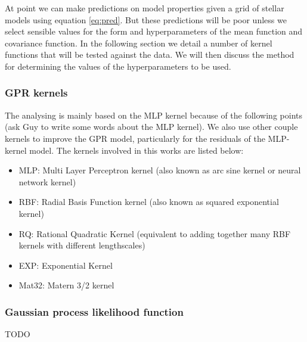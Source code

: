 At point we can make predictions on model properties given a grid of stellar models using equation \ref{eq:pred}.  But these predictions will be poor unless we select sensible values for the form and hyperparameters of the mean function and covariance function.  In the following section we detail a number of kernel functions that will be tested against the data.  We will then discuss the method for determining the values of the hyperparameters to be used.

\subsubsection{GPR kernels}
The analysing is mainly based on the MLP kernel because of the following points (ask Guy to write some words about the MLP kernel).
We also use other couple kernels to improve the GPR model, particularly for the residuals of the MLP-kernel model.  
The kernels involved in this works are listed below:

\begin{itemize}
\item MLP: Multi Layer Perceptron kernel (also known as arc sine kernel or neural network kernel)
\item RBF: Radial Basis Function kernel (also known as squared exponential kernel)
\item RQ: Rational Quadratic Kernel (equivalent to adding together many RBF kernels with different lengthscales)
\item EXP: Exponential Kernel
\item Mat32: Matern 3/2 kernel
\end{itemize}

\subsubsection{Gaussian process likelihood function}

TODO


